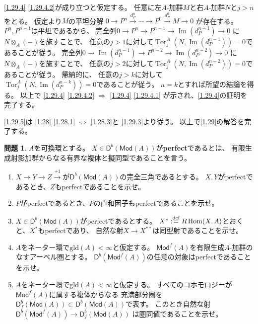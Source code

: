 \documentclass[uplatex,dvipdfmx]{jsarticle}
\makeatletter
\theoremstyle{definition}
\newtheorem{prob}[prob]{問題}
\renewenvironment{proof}[1][\proofname]{
  \pushQED{\qed}%
  \normalfont \topsep6\p@\@plus6\p@\relax
  \trivlist
  \item[\hskip\labelsep
    #1\@addpunct{\textbf{.}}]\ignorespaces
}{%
  \popQED\endtrivlist\@endpefalse
}
\providecommand{\proofname}{証明}
\DeclareMathOperator{\Hom}{\mathrm{Hom}}
\DeclareMathOperator{\im}{\mathrm{Im}}
\DeclareMathOperator{\Tor}{\mathrm{Tor}}
\newcommand{\Mod}{\mathsf{Mod}}
\newcommand{\sfD}{\mathsf{D}}
\newcommand{\gld}{\mathrm{gld}}
\def\dfn{:\overset{\mbox{{\scriptsize def}}}{=}}
\makeatother
\begin{document}
\begin{proof}
  \ref{1.29.4} \ref{1.29.4.2}が成り立つと仮定する。
  任意に左\(A\)-加群\(M\)と右\(A\)-加群\(N\)と\(j>n\)をとる。
  仮定より\(M\)の平坦分解
  \(0 \to P^n \xrightarrow{d_P^n} \cdots \to P^0 \xrightarrow{d_P^0} M\to 0\)
  が存在する。
  \(P^n,P^{n-1}\)は平坦であるから、
  完全列\(0\to P^n \to P^{n-1} \to \im(d_P^{n-1})\to 0\)
  に\(N\otimes_A(-)\)を施すことで、
  任意の\(j>1\)に対して\(\Tor_j^A(N,\im(d_P^{n-1}))=0\)であることが従う。
  完全列\(0\to \im(d_P^{n-1})\to P^{n-2}\to \im(d_P^{n-2}) \to 0\)
  に\(N\otimes_A(-)\)を施すことで、
  任意の\(j>2\)に対して\(\Tor_j^A(N,\im(d_P^{n-2}))=0\)であることが従う。
  帰納的に、
  任意の\(j>k\)に対して\(\Tor_j^A(N,\im(d_P^{n-k}))=0\)であることが従う。
  \(n=k\)とすれば所望の結論を得る。
  以上で
  \ref{1.29.4} \ref{1.29.4.2} \(\Rightarrow\) \ref{1.29.4} \ref{1.29.4.1}
  が示され、\ref{1.29.4}の証明を完了する。

  \ref{1.29.5}は
  \autoref{1.28} \ref{1.28.1} \(\iff\) \ref{1.28.3}と
  \ref{1.29.3}より従う。
  以上で\autoref{1.29}の解答を完了する。
\end{proof}




\begin{prob}\label{1.30}
  \(A\)を可換環とする。
  \(X\in \sfD^b(\Mod(A))\)が\textbf{perfect}であるとは、
  有限生成射影加群からなる有界な複体と擬同型であることを言う。
  \begin{enumerate}
    \item \label{1.30.1}
    \(X\to Y\to Z\xrightarrow{+1}\)が\(\sfD^b(\Mod(A))\)の完全三角であるとする。
    \(X,Y\)がperfectであるとき、\(Z\)もperfectであることを示せ。
    \item \label{1.30.2}
    \(P\)がperfectであるとき、\(P\)の直和因子もperfectであることを示せ。
    \item \label{1.30.3}
    \(X\in \sfD^b(\Mod(A))\)がperfectであるとする。
    \(X^*\dfn R\Hom(X,A)\)とおくと、\(X^*\)もperfectであり、
    自然な射\(X\to X^{**}\)は同型射であることを示せ。
    \item \label{1.30.4}
    \(A\)をネーター環で\(\gld(A) < \infty\)と仮定する。
    \(\Mod^f(A)\)を有限生成\(A\)-加群のなすアーベル圏とする。
    \(\sfD^b(\Mod^f(A))\)の任意の対象はperfectであることを示せ。
    \item \label{1.30.5}
    \(A\)をネーター環で\(\gld(A) < \infty\)と仮定する。
    すべてのコホモロジーが\(\Mod^f(A)\)に属する複体からなる
    充満部分圏を\(\sfD^b_f(\Mod(A))\subset \sfD^b(\Mod(A))\)で表す。
    このとき自然な射\(\sfD^b(\Mod^f(A)) \to \sfD^b_f(\Mod(A))\)
    は圏同値であることを示せ。
  \end{enumerate}
\end{prob}
\end{document}
